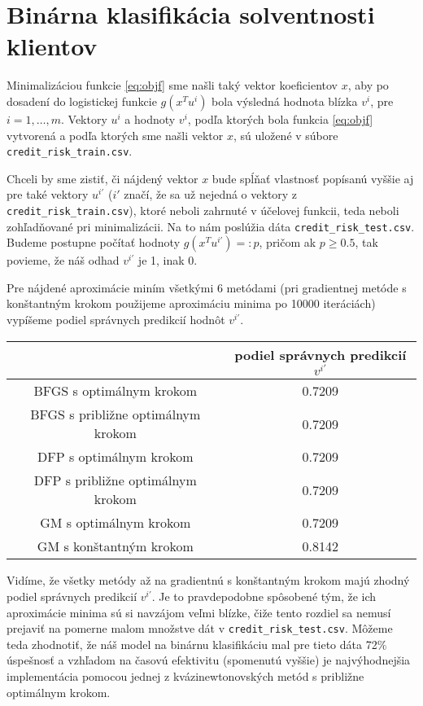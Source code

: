 \documentclass[report.tex]{subfiles}
\begin{document}
\section{Binárna klasifikácia solventnosti klientov}\label{sec:G}

Minimalizáciou funkcie \ref{eq:objf} sme našli taký vektor koeficientov $x$, aby po dosadení do logistickej funkcie $g(x^Tu^i)$ bola výsledná hodnota blízka $v^i$, pre $i=1,\dots,m$. Vektory $u^i$ a hodnoty $v^i$, podľa ktorých bola funkcia \ref{eq:objf} vytvorená a podľa ktorých sme našli vektor $x$, sú uložené v súbore \verb*|credit_risk_train.csv|.

Chceli by sme zistiť, či nájdený vektor $x$ bude spĺňať vlastnosť popísanú vyššie aj pre také vektory $u^{i'}$ ($i'$ značí, že sa už nejedná o vektory z \verb*|credit_risk_train.csv|), ktoré neboli zahrnuté v účelovej funkcii, teda neboli zohľadňované pri minimalizácii. Na to nám poslúžia dáta \verb*|credit_risk_test.csv|. Budeme postupne počítať hodnoty $g(x^Tu^{i'}) =: p$, pričom ak $p \geq 0.5$, tak povieme, že náš odhad $v^{i'}$ je 1, inak 0.

Pre nájdené aproximácie miním všetkými 6 metódami (pri gradientnej metóde s konštantným krokom použijeme aproximáciu minima po 10000 iteráciách) vypíšeme podiel správnych predikcií hodnôt $v^{i'}$.

\begin{center}
	\small
	\begin{tabular}{| c | c |}
		\hline
		& podiel správnych predikcií $v^{i'}$  \\
		\hline
		BFGS s optimálnym krokom & 0.7209  \\
		BFGS s približne optimálnym krokom & 0.7209  \\
		DFP s optimálnym krokom & 0.7209  \\
		DFP s približne optimálnym krokom & 0.7209  \\
		GM s optimálnym krokom & 0.7209  \\
		GM s konštantným krokom & 0.8142  \\
		\hline
	\end{tabular}
\end{center}

Vidíme, že všetky metódy až na gradientnú s konštantným krokom majú zhodný podiel správnych predikcií $v^{i'}$. Je to pravdepodobne spôsobené tým, že ich aproximácie minima sú si navzájom veľmi blízke, čiže tento rozdiel sa nemusí prejaviť na pomerne malom množstve dát v \verb*|credit_risk_test.csv|. Môžeme teda zhodnotiť, že náš model na binárnu klasifikáciu mal pre tieto dáta 72\% úspešnosť a vzhľadom na časovú efektivitu (spomenutú vyššie) je najvýhodnejšia implementácia pomocou jednej z kvázinewtonovských metód s približne optimálnym krokom.
\end{document}
